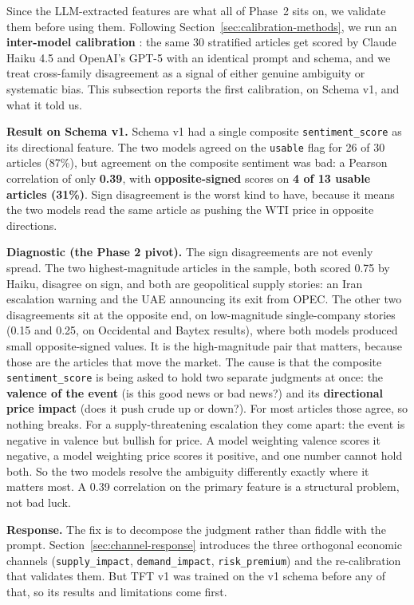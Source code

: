 Since the LLM-extracted features are what all of Phase~2 sits on, we validate them before using them. Following Section~\ref{sec:calibration-methods}, we run an \textbf{inter-model calibration} \citep{gilardi2023, zheng2023}: the same 30 stratified articles get scored by Claude Haiku 4.5 and OpenAI's GPT-5 with an identical prompt and schema, and we treat cross-family disagreement as a signal of either genuine ambiguity or systematic bias. This subsection reports the first calibration, on Schema v1, and what it told us.

\textbf{Result on Schema v1.} Schema v1 had a single composite \texttt{sentiment\_score} as its directional feature. The two models agreed on the \texttt{usable} flag for 26 of 30 articles (87\%), but agreement on the composite sentiment was bad: a Pearson correlation of only \textbf{0.39}, with \textbf{opposite-signed} scores on \textbf{4 of 13 usable articles (31\%)}. Sign disagreement is the worst kind to have, because it means the two models read the same article as pushing the WTI price in opposite directions.

\textbf{Diagnostic (the Phase 2 pivot).} The sign disagreements are not evenly spread. The two highest-magnitude articles in the sample, both scored 0.75 by Haiku, disagree on sign, and both are geopolitical supply stories: an Iran escalation warning and the UAE announcing its exit from OPEC. The other two disagreements sit at the opposite end, on low-magnitude single-company stories (0.15 and 0.25, on Occidental and Baytex results), where both models produced small opposite-signed values. It is the high-magnitude pair that matters, because those are the articles that move the market. The cause is that the composite \texttt{sentiment\_score} is being asked to hold two separate judgments at once: the \textbf{valence of the event} (is this good news or bad news?) and its \textbf{directional price impact} (does it push crude up or down?). For most articles those agree, so nothing breaks. For a supply-threatening escalation they come apart: the event is negative in valence but bullish for price. A model weighting valence scores it negative, a model weighting price scores it positive, and one number cannot hold both. So the two models resolve the ambiguity differently exactly where it matters most. A 0.39 correlation on the primary feature is a structural problem, not bad luck.

\textbf{Response.} The fix is to decompose the judgment rather than fiddle with the prompt. Section~\ref{sec:channel-response} introduces the three orthogonal economic channels (\texttt{supply\_impact}, \texttt{demand\_impact}, \texttt{risk\_premium}) and the re-calibration that validates them. But TFT v1 was trained on the v1 schema before any of that, so its results and limitations come first.

